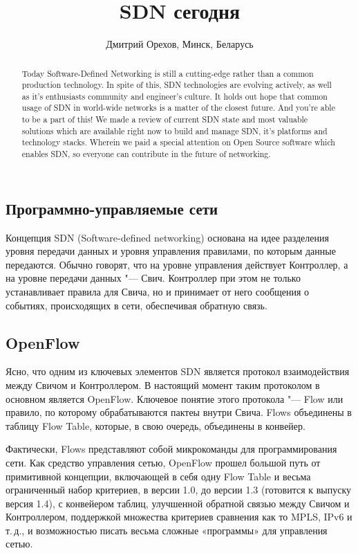 \documentclass[10pt, a5paper]{article}
\begin{document}
\title{SDN сегодня}
\author{Дмитрий Орехов, Минск, Беларусь}
\maketitle
\begin{abstract}
Today Software-Defined Networking is still a cutting-edge rather than a common production technology. In spite of this, SDN technologies are evolving actively, as well as it's enthusiasts com\-mu\-ni\-ty and engineer's culture. It holds out hope that common usage of SDN in world-wide networks is a matter of the closest future. And you're able to be a part of this!
We made a review of current SDN state and most valuable solutions which are available right now to build and manage SDN, it's platforms and technology stacks. Wherein we paid a special attention on Open Source software which enables SDN, so everyone can contribute in the future of networking.
\end{abstract}
\subsection*{Программно-управляемые сети}

Концепция SDN (Software-defined networking) основана на идее разделения уровня передачи данных и уровня управления правилами, по которым данные передаются. Обычно говорят, что на уровне управления действует Контроллер, а на уровне передачи данных "--- Свич. Контроллер при этом не только устанавливает правила для Свича, но и принимает от него сообщения о событиях, происходящих в сети, обеспечивая обратную связь.

\subsection*{OpenFlow}

Ясно, что одним из ключевых элементов SDN является протокол взаимодействия между Свичом и Контроллером. В настоящий момент таким протоколом в основном является OpenFlow. Ключевое понятие этого протокола "--- Flow или правило, по которому обрабатываются пактеы внутри Свича. Flows объединены в таблицу Flow Table, которые, в свою очередь, объединены в конвейер.

Фактически, Flows представляют собой микрокоманды для программирования сети. Как средство управления сетью, OpenFlow прошел большой путь от примитивной концепции, включающей в себя одну Flow Table и весьма ограниченный набор критериев, в версии 1.0, до версии 1.3 (готовится к выпуску версия 1.4), с конвейером таблиц, улучшенной обратной связью между Свичом и Контроллером, поддержкой множества критериев сравнения как то MPLS, IPv6 и т.\,д., и возможностью писать весьма сложные «программы» для управления сетью.
\end{document}
